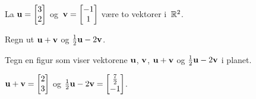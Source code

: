 
\begin{oppgave}
La $\mathbf{u} = \begin{bmatrix} 3 \\ 2 \end{bmatrix}$ og~$\mathbf{v} = \begin{bmatrix} -1 \\ 1 \end{bmatrix}$ være to vektorer
i~$\mathbb{R}^2$.

\begin{punkt}
Regn ut $\mathbf{u} + \mathbf{v}$ og $\frac{1}{2} \mathbf{u} - 2 \mathbf{v}$.
\end{punkt}

\begin{punkt}
Tegn en figur som viser vektorene $\mathbf{u}$, $\mathbf{v}$, $\mathbf{u} + \mathbf{v}$ og
$\frac{1}{2} \mathbf{u} - 2 \mathbf{v}$ i planet.
\end{punkt}
\end{oppgave}

\begin{losning}
\begin{punkt}
	$\mathbf{u} + \mathbf{v}=
	\begin{bmatrix}
	2\\
	3
	\end{bmatrix}
	$ og $\frac{1}{2} \mathbf{u} - 2 \mathbf{v}=
	\begin{bmatrix}
	\frac{7}{2}\\
	-1
	\end{bmatrix}
	$.
\end{punkt}

\begin{punkt}
\end{punkt}
\begin{center}
\end{center}
\end{losning}

